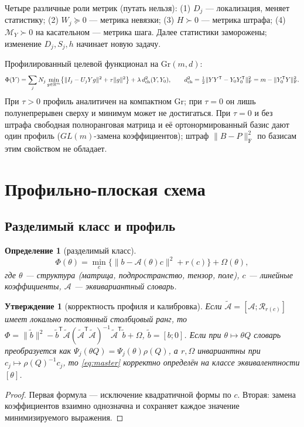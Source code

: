 \documentclass[11pt,a4paper]{article}
\newcommand{\R}{\mathbb R}
\newcommand{\T}{^{\mathsf T}}
\newcommand{\F}{_{\mathrm F}}
\newcommand{\Gr}{\mathrm{Gr}}
\newtheorem{proposition}[theorem]{Утверждение}
\newtheorem{definition}[theorem]{Определение}
\theoremstyle{remark}
\begin{document}
Четыре различные роли метрик (путать нельзя):
(1) $D_j$ --- локализация, меняет статистику;
(2) $W_j\succeq0$ --- метрика невязки;
(3) $H\succ0$ --- метрика штрафа;
(4) $\mathcal M_Y\succ0$ на касательном --- метрика шага.
Далее статистики заморожены; изменение $D_j,S_j,h$ начинает новую задачу.

Профилированный целевой функционал на $\Gr(m,d)$:
\begin{equation}\label{eq:profile}
 \Phi(Y)=\sum_jN_j\min_{g\in\R^m}\bigl\{\|I_j-U_jYg\|^2+\tau\|g\|^2\bigr\}
 +\lambda\,d_{\rm ch}^2(Y,Y_0),\qquad
 d_{\rm ch}^2=\tfrac12\|YY\T-Y_0Y_0\T\|\F^2=m-\|Y_0\T Y\|\F^2.
\end{equation}
При $\tau>0$ профиль аналитичен на компактном $\Gr$; при $\tau=0$ он лишь
полунепрерывен сверху и минимум может не достигаться.
При $\tau=0$ и без штрафа свободная полноранговая матрица и её
ортонормированный базис дают один профиль ($GL(m)$-замена коэффициентов);
штраф $\|B-P\|\F^2$ по базисам этим свойством не обладает.

\section{Профильно-плоская схема}\label{sec:scheme}

\subsection{Разделимый класс и профиль}\label{sec:master}

\begin{definition}[разделимый класс]\label{def:master}
\begin{equation}\label{eq:master}
 \Phi(\theta)=\min_c\bigl\{\|b-\mathcal A(\theta)c\|^2+r(c)\bigr\}+\Omega(\theta),
\end{equation}
где $\theta$ --- структура (матрица, подпространство, тензор, поле),
 $c$ --- линейные коэффициенты, $\mathcal A$ --- эквивариантный словарь.
\end{definition}

\begin{proposition}[корректность профиля и калибровка]\label{prop:profile}
Если $\widetilde{\mathcal A}=[\mathcal A;\mathcal R_{r(c)}]$ имеет локально
постоянный столбцовый ранг, то
 $\Phi=\|\tilde b\|^2-\tilde b\T\widetilde{\mathcal A}
(\widetilde{\mathcal A}\T\widetilde{\mathcal A})^{-1}\widetilde{\mathcal A}\T\tilde b+\Omega$,
 $\tilde b=[b;0]$. Если при $\theta\mapsto\theta Q$ словарь преобразуется как
 $\Psi_j(\theta Q)=\Psi_j(\theta)\rho(Q)$, а $r,\Omega$ инвариантны при
 $c_j\mapsto\rho(Q)^{-1}c_j$, то \eqref{eq:master} корректно определён на
классе эквивалентности $[\theta]$.
\end{proposition}
\begin{proof}
Первая формула --- исключение квадратичной формы по $c$. Вторая: замена
коэффициентов взаимно однозначна и сохраняет каждое значение минимизируемого
выражения.
\end{proof}
\end{document}
